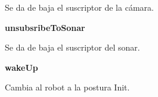 \begin{fulllineitems}
\label{\detokenize{dev_docs:com.lar.cloudnao.Robot.unsubscribeToCamera()}}
Se da de baja el suscriptor de la cámara.

\end{fulllineitems}



\textbf{unsubsribeToSonar}
\label{\detokenize{dev_docs:unsubsribetosonar}}

\begin{fulllineitems}
\label{\detokenize{dev_docs:com.lar.cloudnao.Robot.unsubsribeToSonar()}}
Se da de baja el suscriptor del sonar.

\end{fulllineitems}



\textbf{wakeUp}
\label{\detokenize{dev_docs:wakeup}}

\begin{fulllineitems}
\label{\detokenize{dev_docs:com.lar.cloudnao.Robot.wakeUp()}}
Cambia al robot a la postura Init.

\end{fulllineitems}

